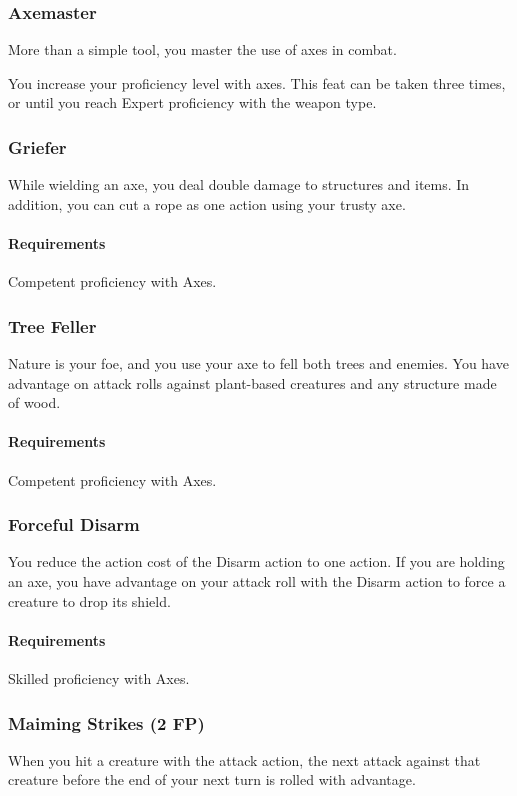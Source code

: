 \subsubsection{Axemaster} \label{feat::axemaster}
    More than a simple tool, you master the use of axes in combat.

    You increase your proficiency level with axes.
    This feat can be taken three times, or until you reach Expert proficiency with the weapon type.
\subsubsection{Griefer} \label{feat::griefer}
    While wielding an axe, you deal double damage to structures and items.
    In addition, you can cut a rope as one action using your trusty axe.
    \paragraph{Requirements} Competent proficiency with Axes.
\subsubsection{Tree Feller} \label{feat::treefeller}
    Nature is your foe, and you use your axe to fell both trees and enemies.
    You have advantage on attack rolls against plant-based creatures and any structure made of wood.
    \paragraph{Requirements} Competent proficiency with Axes.
\subsubsection{Forceful Disarm} \label{feat::forcefuldisarm}
    You reduce the action cost of the Disarm action to one action.
    If you are holding an axe, you have advantage on your attack roll with the Disarm action to force a creature to drop its shield.
    \paragraph{Requirements} Skilled proficiency with Axes.
\subsubsection{Maiming Strikes (2 FP)} \label{feat::maimingstrikes}
    When you hit a creature with the attack action, the next attack against that creature before the end of your next turn is rolled with advantage.
